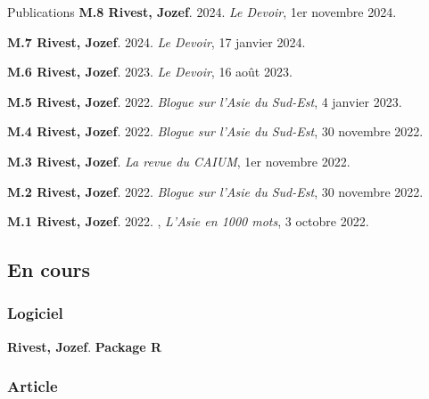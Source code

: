 \documentclass{resume} %
\begin{document}
\begin{rSection}{Publications}
{\textbf{M.8 Rivest, Jozef}. 2024.  \textit{Le Devoir}, 1er novembre 2024.}

{\textbf{M.7 Rivest, Jozef}. 2024.  \textit{Le Devoir}, 17 janvier 2024.} \par

{\textbf{M.6 Rivest, Jozef}. 2023.  \textit{Le Devoir}, 16 août 2023.} \par

{\textbf{M.5 Rivest, Jozef}. 2022.  \textit{Blogue sur l'Asie du Sud-Est}, 4 janvier 2023.} \par 

{\textbf{M.4 Rivest, Jozef}. 2022.  \textit{Blogue sur l'Asie du Sud-Est}, 30 novembre 2022.} \par

{\textbf{M.3 Rivest, Jozef}.  \textit{La revue du CAIUM}, 1er novembre 2022.} \par

{\textbf{M.2 Rivest, Jozef}. 2022.  \textit{Blogue sur l'Asie du Sud-Est}, 30 novembre 2022.} \par 

{\textbf{M.1 Rivest, Jozef}. 2022. , \textit{L'Asie en 1000 mots}, 3 octobre 2022.} \par

\subsection*{En cours}

\subsubsection*{Logiciel}

{\textbf{Rivest, Jozef}.  \textbf{Package R}}

\subsubsection*{Article}


\end{rSection}
\end{document}
